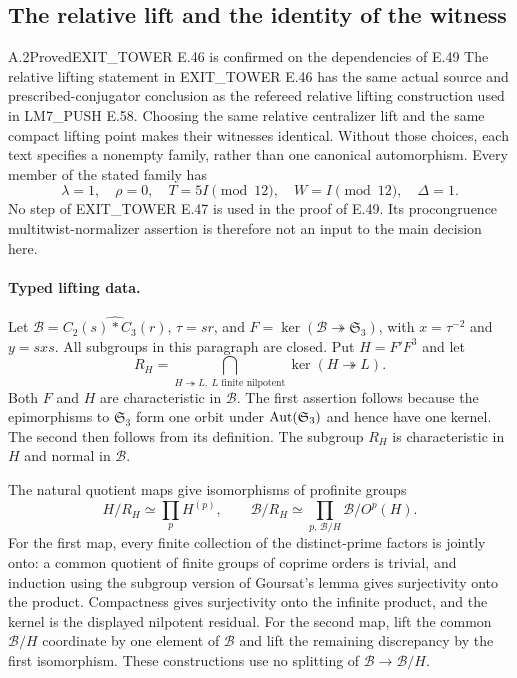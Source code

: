 \subsection{The relative lift and the identity of the witness}

\begin{result}{A.2}{Proved}{EXIT\_TOWER E.46 is confirmed on the dependencies of E.49}
The relative lifting statement in EXIT\_TOWER E.46 has the same actual source and prescribed-conjugator conclusion as the refereed relative lifting construction used in LM7\_PUSH E.58. Choosing the same relative centralizer lift and the same compact lifting point makes their witnesses identical. Without those choices, each text specifies a nonempty family, rather than one canonical automorphism. Every member of the stated family has
\[
 \lambda=1,\quad \rho=0,\quad
 T=5I\pmod {12},\quad W=I\pmod {12},\quad\Delta=1.
 \tag{A.L1}
\]
No step of EXIT\_TOWER E.47 is used in the proof of E.49. Its procongruence multitwist-normalizer assertion is therefore not an input to the main decision here.
\end{result}

\paragraph{Typed lifting data.}
Let $\mathcal B=\widehat{C_2(s)*C_3(r)}$, $\tau=sr$, and
$F=\ker(\mathcal B\twoheadrightarrow\mathfrak S_3)$, with
$x=\tau^{-2}$ and $y=sxs$. All subgroups in this paragraph are closed.
Put $H=F'F^3$ and let
\[
 R_H=\bigcap_{H\twoheadrightarrow L,\ L\text{ finite nilpotent}}
              \ker(H\twoheadrightarrow L).
\]
Both $F$ and $H$ are characteristic in $\mathcal B$. The first assertion follows because the epimorphisms to $\mathfrak S_3$ form one orbit under $\operatorname{Aut}(\mathfrak S_3)$ and hence have one kernel. The second then follows from its definition. The subgroup $R_H$ is characteristic in $H$ and normal in $\mathcal B$.

The natural quotient maps give isomorphisms of profinite groups
\[
 H/R_H\simeq\prod_p H^{(p)},\qquad
 \mathcal B/R_H\simeq
       \prod_{p,\,\mathcal B/H}\mathcal B/O^p(H).
 \tag{A.L2}
\]
For the first map, every finite collection of the distinct-prime factors is jointly onto: a common quotient of finite groups of coprime orders is trivial, and induction using the subgroup version of Goursat's lemma gives surjectivity onto the product. Compactness gives surjectivity onto the infinite product, and the kernel is the displayed nilpotent residual. For the second map, lift the common $\mathcal B/H$ coordinate by one element of $\mathcal B$ and lift the remaining discrepancy by the first isomorphism. These constructions use no splitting of $\mathcal B\to\mathcal B/H$.

